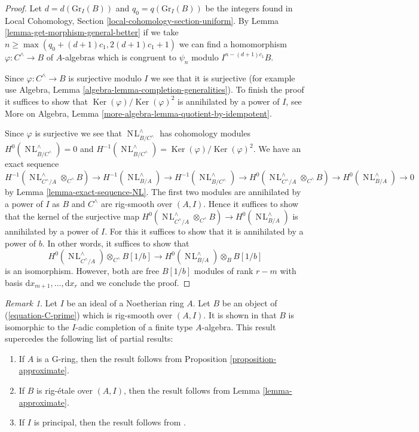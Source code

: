 \documentclass{stacks-project}
\theoremstyle{plain}
\theoremstyle{definition}
\theoremstyle{remark}
\newtheorem{remark}[subsection]{Remark}
\numberwithin{equation}{subsection}
\def\NL{\mathop{N\!L}\nolimits}
\def\Ker{\mathop{\mathrm{Ker}}}
\begin{document}
\begin{proof}
\medskip\noindent
Let $d = d(\text{Gr}_I(B))$ and $q_0 = q(\text{Gr}_I(B))$ be the integers
found in 
Local Cohomology, Section \ref{local-cohomology-section-uniform}.
By Lemma \ref{lemma-get-morphism-general-better} if we take
$n \geq \max(q_0 + (d + 1)c_1, 2(d + 1)c_1 + 1)$ we can find a homomorphism
$\varphi : C^\wedge \to B$ of $A$-algebras which is congruent to
$\psi_n$ modulo $I^{n - (d + 1)c_1}B$.

\medskip\noindent
Since $\varphi : C^\wedge \to B$ is surjective modulo $I$
we see that it is surjective (for example use
Algebra, Lemma \ref{algebra-lemma-completion-generalities}).
To finish the proof it suffices to show that
$\Ker(\varphi)/\Ker(\varphi)^2$ is annihilated by a power of $I$, see
More on Algebra, Lemma \ref{more-algebra-lemma-quotient-by-idempotent}.

\medskip\noindent
Since $\varphi$ is surjective we see that
$\NL_{B/C^{\wedge}}^\wedge$ has cohomology modules
$H^0(\NL_{B/C^{\wedge}}^\wedge) = 0$ and
$H^{-1}(\NL_{B/C^{\wedge}}^\wedge) = \Ker(\varphi)/\Ker(\varphi)^2$.
We have an exact sequence
$$
H^{-1}(\NL_{C^\wedge/A}^\wedge \otimes_{C^\wedge} B) \to
H^{-1}(\NL_{B/A}^\wedge) \to
H^{-1}(\NL_{B/C^{\wedge}}^\wedge) \to
H^0(\NL_{C^\wedge/A}^\wedge \otimes_{C^\wedge} B) \to
H^0(\NL_{B/A}^\wedge) \to 0
$$
by Lemma \ref{lemma-exact-sequence-NL}. The first two modules are
annihilated by a power of $I$ as $B$ and $C^\wedge$ are rig-smooth over
$(A, I)$. Hence it suffices
to show that the kernel of the surjective map
$H^0(\NL_{C^\wedge/A}^\wedge \otimes_{C^\wedge} B) \to
H^0(\NL_{B/A}^\wedge)$ is annihilated by a power of $I$.
For this it suffices to show that it is annihilated by
a power of $b$. In other words, it suffices to show that
$$
H^0(\NL_{C^\wedge/A}^\wedge) \otimes_{C^\wedge} B[1/b]
\longrightarrow
H^0(\NL_{B/A}^\wedge) \otimes_B B[1/b]
$$
is an isomorphism. However, both are free $B[1/b]$ modules
of rank $r - m$ with basis $\text{d}x_{m + 1}, \ldots, \text{d}x_r$
and we conclude the proof.
\end{proof}

\begin{remark}
\label{remark-discussion}
Let $I$ be an ideal of a Noetherian ring $A$. Let $B$ be an object
of (\ref{equation-C-prime}) which is rig-smooth over $(A, I)$.
It is shown in \cite[Theorem 1.2]{gabber-zavyalov} that $B$ is
isomorphic to the $I$-adic completion of a finite type $A$-algebra.
This result supercedes the following list of partial results:
\begin{enumerate}
\item If $A$ is a G-ring, then the result follows from
Proposition \ref{proposition-approximate}.
\item If $B$ is rig-\'etale over $(A, I)$, then the result follows from
Lemma \ref{lemma-approximate}.
\item If $I$ is principal, then the result follows from
\cite[III Theorem 7]{Elkik}.
\end{enumerate}
\end{remark}
\end{document}
